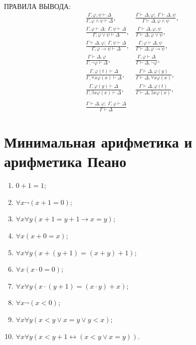 \documentclass[a4paper,11pt]{article}
\begin{document}
ПРАВИЛА ВЫВОДА:
\medskip
\begin{align*}
&\frac{\Gamma,\varphi,\psi\vdash\Delta}{\Gamma,\varphi\land\psi\vdash\Delta},&
\frac{\Gamma\vdash\Delta,\varphi;\;\Gamma\vdash\Delta,\psi}{\Gamma\vdash\Delta,\varphi\land\psi},
\\
&\frac{\Gamma,\varphi\vdash\Delta;\;\Gamma,\psi\vdash\Delta}{\Gamma,\varphi\lor\psi\vdash\Delta},&
\frac{\Gamma\vdash\Delta,\varphi,\psi}{\Gamma\vdash\Delta,\varphi\lor\psi},
\\
&\frac{\Gamma\vdash\Delta,\varphi;\;\Gamma,\psi\vdash\Delta}{\Gamma,\varphi\rightarrow\psi\vdash\Delta},&
\frac{\Gamma,\varphi\vdash\Delta,\psi}{\Gamma\vdash\Delta,\varphi\rightarrow\psi},
\\
&\frac{\Gamma\vdash\Delta,\varphi}{\Gamma,\neg\varphi\vdash\Delta},&
\frac{\Gamma,\varphi\vdash\Delta}{\Gamma\vdash\Delta,\neg\varphi},
\\
&\frac{\Gamma,\varphi(t)\vdash\Delta}{\Gamma,\forall x\varphi(x)\vdash\Delta}, &
\frac{\Gamma\vdash\Delta,\varphi(y)}{\Gamma\vdash\Delta,\forall x\varphi(x)},
\\
&\frac{\Gamma,\varphi(y)\vdash\Delta}{\Gamma,\exists x\varphi(x)\vdash\Delta}, &
\frac{\Gamma\vdash\Delta,\varphi(t)}{\Gamma\vdash\Delta,\exists x\varphi(x)},
\\\\
&\frac{\Gamma\vdash\Delta,\varphi;\;\Gamma,\varphi\vdash\Delta}{\Gamma\vdash\Delta}
\end{align*}

\section{Минимальная арифметика и арифметика Пеано}

\begin{enumerate}
	\item $0 + 1 = 1$;

	\item $\forall x \neg(x + 1 = 0)$;

	\item $\forall x \forall y (x + 1 = y +1 \rightarrow x = y)$; 

	\item $\forall x (x+0 = x)$;

	\item $\forall x \forall y (x + (y + 1)= (x + y) + 1)$; 

	\item $\forall x (x\cdot 0 = 0)$;

	\item $\forall x \forall y (x\cdot (y + 1)= (x \cdot y) + x)$;  

	\item $\forall x \neg (x <0)$;

	\item $\forall x \forall y (x < y \vee x = y \vee y < x)$;  

	\item  $\forall x\forall y (x < y + 1 \leftrightarrow (x < y \vee x = y))$.
\end{enumerate}
\end{document}
